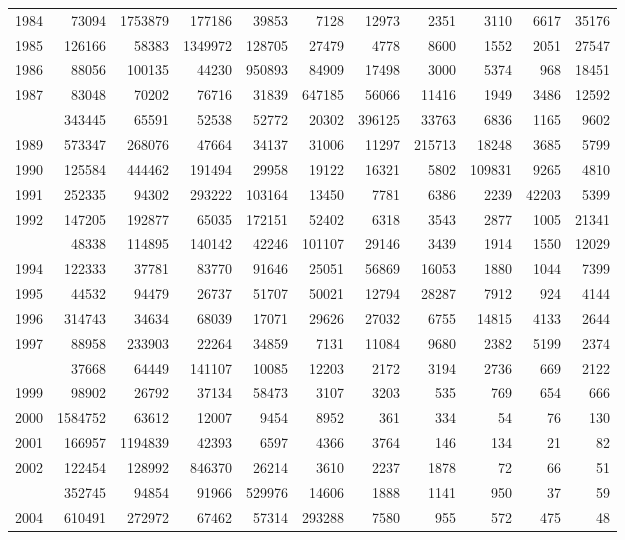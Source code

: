 \documentclass[
]{article}
\begin{document}
\begin{longtable}[t]{lrrrrrrrrrr}
1984 & 73094 & 1753879 & 177186 & 39853 & 7128 & 12973 & 2351 & 3110 & 6617 & 35176\\
1985 & 126166 & 58383 & 1349972 & 128705 & 27479 & 4778 & 8600 & 1552 & 2051 & 27547\\
1986 & 88056 & 100135 & 44230 & 950893 & 84909 & 17498 & 3000 & 5374 & 968 & 18451\\
1987 & 83048 & 70202 & 76716 & 31839 & 647185 & 56066 & 11416 & 1949 & 3486 & 12592\\
\addlinespace
1988 & 343445 & 65591 & 52538 & 52772 & 20302 & 396125 & 33763 & 6836 & 1165 & 9602\\
1989 & 573347 & 268076 & 47664 & 34137 & 31006 & 11297 & 215713 & 18248 & 3685 & 5799\\
1990 & 125584 & 444462 & 191494 & 29958 & 19122 & 16321 & 5802 & 109831 & 9265 & 4810\\
1991 & 252335 & 94302 & 293222 & 103164 & 13450 & 7781 & 6386 & 2239 & 42203 & 5399\\
1992 & 147205 & 192877 & 65035 & 172151 & 52402 & 6318 & 3543 & 2877 & 1005 & 21341\\
\addlinespace
1993 & 48338 & 114895 & 140142 & 42246 & 101107 & 29146 & 3439 & 1914 & 1550 & 12029\\
1994 & 122333 & 37781 & 83770 & 91646 & 25051 & 56869 & 16053 & 1880 & 1044 & 7399\\
1995 & 44532 & 94479 & 26737 & 51707 & 50021 & 12794 & 28287 & 7912 & 924 & 4144\\
1996 & 314743 & 34634 & 68039 & 17071 & 29626 & 27032 & 6755 & 14815 & 4133 & 2644\\
1997 & 88958 & 233903 & 22264 & 34859 & 7131 & 11084 & 9680 & 2382 & 5199 & 2374\\
\addlinespace
1998 & 37668 & 64449 & 141107 & 10085 & 12203 & 2172 & 3194 & 2736 & 669 & 2122\\
1999 & 98902 & 26792 & 37134 & 58473 & 3107 & 3203 & 535 & 769 & 654 & 666\\
2000 & 1584752 & 63612 & 12007 & 9454 & 8952 & 361 & 334 & 54 & 76 & 130\\
2001 & 166957 & 1194839 & 42393 & 6597 & 4366 & 3764 & 146 & 134 & 21 & 82\\
2002 & 122454 & 128992 & 846370 & 26214 & 3610 & 2237 & 1878 & 72 & 66 & 51\\
\addlinespace
2003 & 352745 & 94854 & 91966 & 529976 & 14606 & 1888 & 1141 & 950 & 37 & 59\\
2004 & 610491 & 272972 & 67462 & 57314 & 293288 & 7580 & 955 & 572 & 475 & 48\\

\end{longtable}
\end{document}
